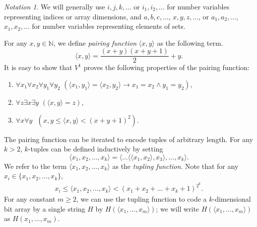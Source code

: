 \documentclass{article}
\theoremstyle{definition}
\theoremstyle{theorem}
\theoremstyle{theorem}
\theoremstyle{remark}
\theoremstyle{remark}
\theoremstyle{example}
\theoremstyle{notation}
\newtheorem{notation}{Notation}
\theoremstyle{theorem}
\begin{document}
\begin{notation}
    We will generally use $i, j, k, \ldots$ or $i_1, i_2, \ldots$ for number variables representing indices or array dimensions, and $a, b, c, \ldots$, $x, y, z, \ldots$, or $a_1, a_2, \ldots$, $x_1, x_2, \ldots$ for number variables representing elements of sets.
\end{notation}

For any $x,y \in \mathbb{N}$, we define \emph{pairing function} $\langle x,y\rangle$ as the following term.
\begin{equation}
\langle x,y\rangle = \frac{(x + y)(x + y + 1)}{2} + y.
\end{equation}
It is easy to show that $V^1$ proves the following properties of the pairing function:
\begin{enumerate}
 \item $\forall x_1\forall x_2\forall y_1\forall y_2\,\, (\langle x_1,y_1\rangle = \langle x_2,y_2\rangle \to x_1=x_2 \wedge y_1=y_2)$,
\item $\forall z \exists x\exists y\,\, (\langle x,y\rangle = z)$,
\item $\forall x\forall y\,\,$  $(x,y \leq \langle x,y\rangle < (x+y+1)^2)$.
\end{enumerate}
The pairing function can be iterated to encode tuples of arbitrary length. For any $k > 2$, $k$-tuples can be defined inductively by setting
\begin{equation}
\langle x_1,x_2,\ldots,x_k\rangle = \langle \ldots \langle \langle x_1, x_2\rangle, x_3 \rangle ,\ldots, x_k \rangle.
\end{equation}
We refer to the term $\langle x_1, x_2, \ldots, x_k \rangle$ as the \emph{tupling function}. Note that for any $x_i \in \{x_1, x_2, \ldots, x_k\}$,
\begin{equation}\label{alksjf}
\begin{gathered}
x_i \leq \langle x_1, x_2, \ldots, x_k \rangle < (x_1 + x_2 + \ldots + x_k + 1)^{2^k}.
\end{gathered}
\end{equation}
For any constant $m\geq 2$, we can use the tupling function to code a $k$-dimensional bit array by a single string $H$ by $ H(\langle x_1,\ldots,x_m\rangle)$; we will write $ H(\langle x_1,\ldots,x_m\rangle)$ as $H(x_1,\ldots,x_m)$.
\end{document}
